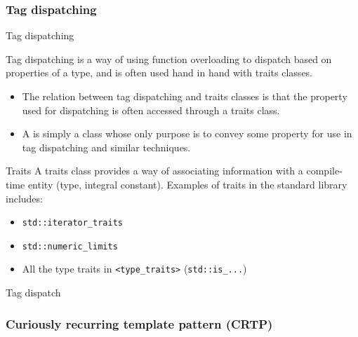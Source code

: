 \subsubsection{Tag dispatching}

\begin{frame}{Tag dispatching}{}
  \begin{block}{Tag dispatching}
     is a way of using function overloading to dispatch based on properties of a type, and is often used hand in hand with traits classes.
    \begin{itemize}
    \item
      The relation between tag dispatching and traits classes is that the property used for dispatching is often accessed through a traits class.
    \item
       A  is simply a class whose only purpose is to convey some property for use in tag dispatching and similar techniques.
    \end{itemize}
  \end{block}

  \begin{block}{Traits}
    A traits class provides a way of associating information with a compile-time entity (type, integral constant). Examples of traits in the standard library includes:
    \begin{itemize}
    \item
      \lstinline!std::iterator_traits!
    \item
      \lstinline!std::numeric_limits!
    \item
      All the type traits in \lstinline!<type_traits>! (\lstinline!std::is_...!)
    \end{itemize}
  \end{block}
\end{frame}

\begin{frame}{Tag dispatch}{}
  \begin{example}
  \end{example}
\end{frame}

\subsubsection{Curiously recurring template pattern (CRTP)}

